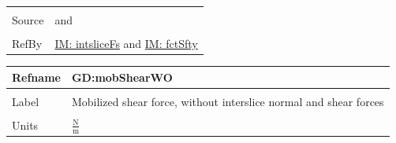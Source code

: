 \documentclass[12pt]{article}
\begin{document}
\begin{minipage}{\textwidth}
\begin{tabular}{>{\raggedright}p{}>{\raggedright\arraybackslash}p{}}
\\ \midrule \\
Source & \cite{chen2005} and \cite{karchewski2012}
         
\\ \midrule \\
RefBy & \hyperref[IM:intsliceFs]{IM: intsliceFs} and \hyperref[IM:fctSfty]{IM: fctSfty}
        
\\ \bottomrule
\end{tabular}
\end{minipage}

\vspace{\baselineskip}
\noindent
\begin{minipage}{\textwidth}
\begin{tabular}{>{\raggedright}p{}>{\raggedright\arraybackslash}p{}}
\toprule \textbf{Refname} & \textbf{GD:mobShearWO}
\label{GD:mobShearWO}
\\ \midrule \\
Label & Mobilized shear force, without interslice normal and shear forces
        
\\ \midrule \\
Units & $\frac{\text{N}}{\text{m}}$
        

\end{tabular}
\end{minipage}
\end{document}
